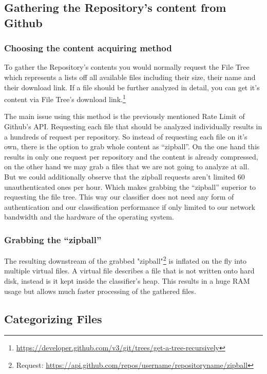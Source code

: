 \documentclass[paper=A4,pagesize=auto,12pt,headinclude=true,footinclude=true,BCOR=0mm,DIV=calc]{scrartcl}
\begin{document}
	\subsection{Gathering the Repository’s content from Github}
	
	\subsubsection{Choosing the content acquiring method}
	
	To gather the Repository’s contents you would normally request the File Tree which represents a lists off all available files including their size, their name and their download link. If a file should be further analyzed in detail, you can get it’s content via File Tree’s download link.\footnote{\url{	https://developer.github.com/v3/git/trees/get-a-tree-recursively}}
	
	The main issue using this method is the previously mentioned Rate Limit of Github’s API. Requesting each file that should be analyzed individually results in a hundreds of request per repository.
	So instead of requesting each file on it’s own, there is the option to grab whole content as “zipball”. On the one hand this results in only one request per repository and the content is already compressed, on the other hand we may grab a files that we are not going to analyze at all. 
	But we could  additionally observe that the zipball requests aren’t limited 60 unauthenticated ones per hour. Which makes grabbing the “zipball” superior to requesting the file tree. This way our classifier does not need any form of authentication and our classification performance if only limited to our network bandwidth and the hardware of the operating system.
	
	\subsubsection{ Grabbing the “zipball”}
	
	
	The resulting downstream of the grabbed "zipball"\footnote{Request: \url{https://api.github.com/repos/username/repositoryname/zipball}} is inflated on the fly into multiple virtual files. A virtual file describes a file that is not written onto hard disk, instead is it kept inside the classifier’s heap. This results in a huge RAM usage but allows much faster processing of the gathered files.
	
	\subsection{Categorizing Files}
	
\end{document}
